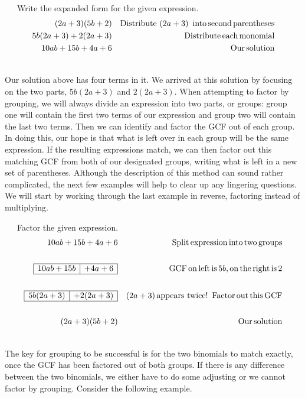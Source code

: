 \begin{example}~~~Write the expanded form for the given expression.
  \begin{eqnarray*}
    (2 a + 3) (5 b + 2) &  & \operatorname{Distribute~} (2 a + 3) \operatorname{~into}
    \operatorname{second} \operatorname{parentheses}\\
    5 b (2 a + 3) + 2 (2 a + 3) &  & \operatorname{Distribute} \operatorname{each}
    \operatorname{monomial}\\
    10ab + 15 b + 4 a + 6 &  & \operatorname{Our} \operatorname{solution}
  \end{eqnarray*}
\end{example}
~\\
Our solution above has four terms in it.  We arrived at this solution by focusing on
the two parts, $5 b (2 a + 3)$ and $2 (2 a + 3)$.\pp
When attempting to factor by grouping, we will always divide an expression into two parts, or groups: group one will contain the first two terms of our expression and group two will contain the last two terms. Then we can identify and factor the GCF out of each group.  In doing this, our hope is that what is left over in each group will be the same expression. If the resulting expressions match, we can then factor out this matching GCF from both of our designated groups, writing what is left in a new set of parentheses.\pp
Although the description of this method can sound rather complicated, the next few examples will help to clear up any lingering questions.  We will start by working through the last example in reverse, factoring instead of multiplying.

\begin{example}~~~Factor the given expression.
  \begin{eqnarray*}
    10 ab + 15 b + 4 a + 6 &  & \operatorname{Split} \operatorname{expression} \operatorname{into}
    \operatorname{two} \operatorname{groups}\\
&&\\
    \begin{array}{|l|l|}
      \hline
      10 ab + 15 b & + 4 a + 6\\
      \hline
    \end{array} &  & \operatorname{GCF} \operatorname{on} \operatorname{left} \operatorname{is} 5 b, \operatorname{on}
    \operatorname{the} \operatorname{right} \operatorname{is} 2\\
&&\\
    \begin{array}{|l|l|}
      \hline
      5 b (2 a + 3) & + 2 (2 a + 3)\\
      \hline
    \end{array} &  & (2 a + 3) \operatorname{appears~twice} !
    \operatorname{~Factor} \operatorname{out} \operatorname{this} \operatorname{GCF}\\
&&\\
    (2 a + 3) (5 b + 2) &  & \operatorname{Our} \operatorname{solution}
  \end{eqnarray*}
\end{example}
~\\  
The key for grouping to be successful is for the two binomials to match exactly, once the GCF has been factored out of both groups. If there is any difference between the two binomials, we either have to do some adjusting or we cannot factor by grouping. Consider the following example.

